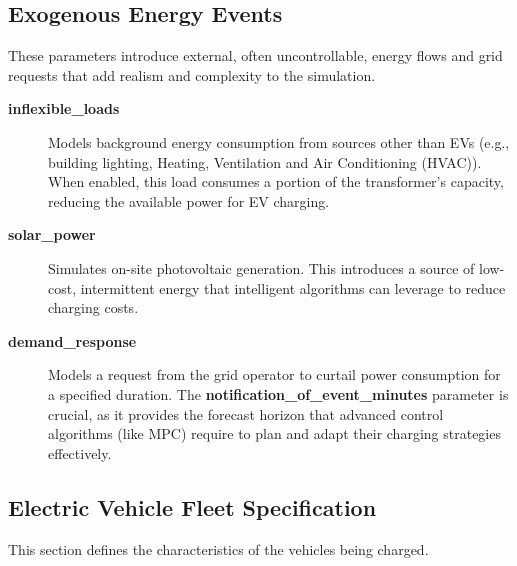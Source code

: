 \subsection{Exogenous Energy Events}

These parameters introduce external, often uncontrollable, energy flows and grid requests that add realism and complexity to the simulation.

\begin{description}
    \item[\textbf{\textbf{inflexible\_loads}}] Models background energy consumption from sources other than EVs (e.g., building lighting, Heating, Ventilation and Air Conditioning (HVAC)). When enabled, this load consumes a portion of the transformer's capacity, reducing the available power for EV charging.
    
    \item[\textbf{\textbf{solar\_power}}] Simulates on-site photovoltaic generation. This introduces a source of low-cost, intermittent energy that intelligent algorithms can leverage to reduce charging costs.
    
    \item[\textbf{\textbf{demand\_response}}] Models a request from the grid operator to curtail power consumption for a specified duration. The \textbf{notification\_of\_event\_minutes} parameter is crucial, as it provides the forecast horizon that advanced control algorithms (like MPC) require to plan and adapt their charging strategies effectively.
\end{description}

\subsection{Electric Vehicle Fleet Specification}

This section defines the characteristics of the vehicles being charged.

